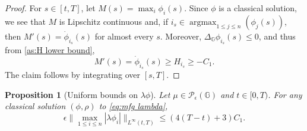 \documentclass[10pt]{article}
\newtheorem{proposition}[theorem]{Proposition}
\numberwithin{equation}{section}
\newcommand{\cP}{ \mathcal{P}}
\def\G{\mathbb{G}}
\begin{document}
\begin{proof}
For $s\in [t,T]$, let $M(s)=\max_{i}\phi_i(s)$. Since $\phi$ is a classical solution, we see that $M$ is Lipschitz continuous and, if $i_s\in \operatorname{argmax}_{1\leq j\leq n}(\phi_j(s))$, then $M'(s)=\dot \phi_{i_s}(s)$ for almost every $s$. Moreover,  $\Delta_{\G}\phi_{i_s}(s)\leq0$, and thus from \eqref{as:H lower bound},
\begin{equation}
    M'(s)=\dot \phi_{i_s}(s)\geq H_{i_s}\geq -C_1.
\end{equation}
The claim follows by integrating over $[s,T]$.
\end{proof}
%
%
\begin{proposition}[Uniform bounds on $\lambda \phi$]\label{prop:phi bd} Let $\mu \in \cP_\epsilon(\G)$ and $t\in[0,T)$. For any classical solution $(\phi,\rho)$ to \eqref{eq:mfg lambda},
\begin{equation}
\epsilon \big\|\max_{1\leq i\leq n}| \lambda\phi_i|\big\|_{L^{\infty}(t,T)}\leq (4(T-t)+3)C_1.
\end{equation}
\end{proposition}
\end{document}
